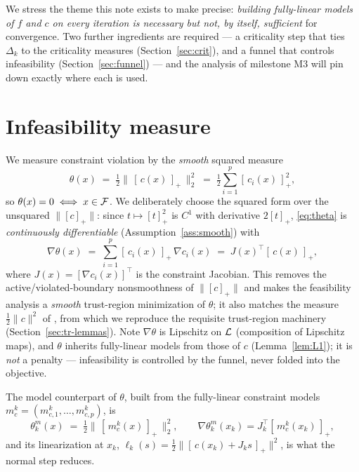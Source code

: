 We stress the theme this note exists to make precise: \emph{building fully-linear
models of $f$ and $c$ on every iteration is necessary but not, by itself,
sufficient} for convergence. Two further ingredients are required --- a
criticality step that ties $\Delta_k$ to the criticality measures
(Section~\ref{sec:crit}), and a funnel that controls infeasibility
(Section~\ref{sec:funnel}) --- and the analysis of milestone M3 will pin down
exactly where each is used.

\section{Infeasibility measure}
\label{sec:infeas}

We measure constraint violation by the \emph{smooth} squared measure
\begin{equation}
  \label{eq:theta}
  \theta(x) \;=\; \tfrac12\bigl\|\,[\,c(x)\,]_+\,\bigr\|_2^2
           \;=\; \tfrac12\sum_{i=1}^p [\,c_i(x)\,]_+^2 ,
\end{equation}
so $\theta(x)=0 \iff x\in\mathcal{F}$. We deliberately choose the squared form over the
unsquared $\|[c]_+\|$: since $t\mapsto[t]_+^2$ is $C^1$ with derivative $2[t]_+$,
\eqref{eq:theta} is \emph{continuously differentiable} (Assumption~\ref{ass:smooth})
with
\begin{equation}
  \label{eq:grad-theta}
  \nabla\theta(x) \;=\; \sum_{i=1}^p [\,c_i(x)\,]_+\,\nabla c_i(x)
                 \;=\; J(x)^{\top}[\,c(x)\,]_+ ,
\end{equation}
where $J(x)=[\nabla c_i(x)]^\top$ is the constraint Jacobian. This removes the
active/violated-boundary nonsmoothness of $\|[c]_+\|$ and makes the feasibility
analysis a \emph{smooth} trust-region minimization of $\theta$; it also matches the
measure $\tfrac12\|c\|^2$ of \citet{GouldToint2010,SampaioToint2015}, from which we
reproduce the requisite trust-region machinery (Section~\ref{sec:tr-lemmas}). Note
$\nabla\theta$ is Lipschitz on $\mathcal{L}$ (composition of Lipschitz maps), and
$\theta$ inherits fully-linear models from those of $c$ (Lemma~\ref{lem:L1}); it is
\emph{not} a penalty --- infeasibility is controlled by the funnel, never folded
into the objective.

The model counterpart of $\theta$, built from the fully-linear constraint models
$m_c^k=(m_{c,1}^k,\dots,m_{c,p}^k)$, is
\begin{equation}
  \label{eq:theta-model}
  \theta_k^m(x) \;=\; \tfrac12\bigl\|\,[\,m_c^k(x)\,]_+\,\bigr\|_2^2,
  \qquad
  \nabla\theta_k^m(x_k)=J_k^{\top}[\,m_c^k(x_k)\,]_+ ,
\end{equation}
and its linearization at $x_k$, $\ell_k(s)=\tfrac12\|[\,c(x_k)+J_k s\,]_+\|^2$, is
what the normal step reduces.

